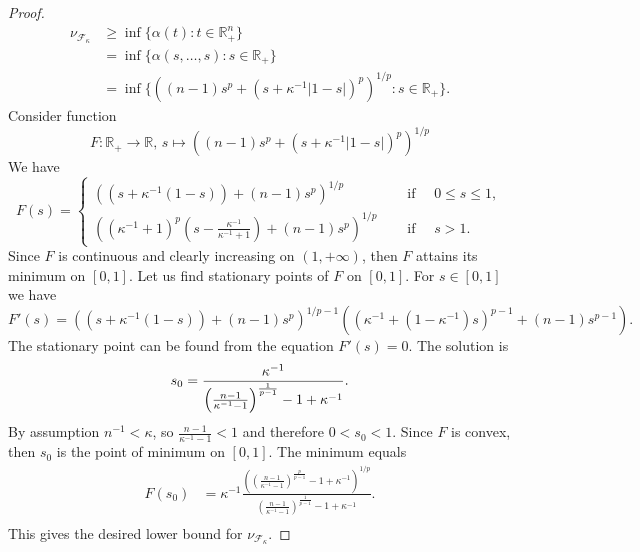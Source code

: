 \documentclass[12pt]{article}
\begin{document}
\begin{proof}
\[\begin{aligned}
        \nu_{\mathcal{F}_{\kappa}}
        &\geq\inf\{\alpha(t) : t\in\mathbb{R}_+^n\} \\
        &=\inf\{\alpha(s,\ldots,s) : s\in\mathbb{R}_+\} \\
        &=\inf\{((n-1)s^p+(s+\kappa^{-1}|1-s|)^p)^{1/p} : s\in\mathbb{R}_+\}.
    \end{aligned}
    \]
    Consider function
    \[
        F:\mathbb{R}_+\to\mathbb{R},\,
        s\mapsto ((n-1)s^p+(s+\kappa^{-1}|1-s|)^p)^{1/p}
    \]
    We have 
    \[
        F(s)=
        \begin{cases}
            ((s+\kappa^{-1}(1-s))+(n-1)s^p)^{1/p}
            \quad&\mbox{ if }\quad 0\leq s\leq 1, \\
            \left(
                (\kappa^{-1}+1)^p
                \left(s-\frac{\kappa^{-1}}{\kappa^{-1}+1}\right)+
                (n-1)s^p
            \right)^{1/p}
            \quad&\mbox{ if }\quad s>1.
        \end{cases}
    \]
    Since $F$ is continuous and clearly increasing on $(1,+\infty)$, 
    then $F$ attains its minimum on $[0, 1]$. Let us find stationary points 
    of $F$ on $[0, 1]$. For $s\in[0,1]$ we have
    \[
        F'(s)=
        ((s+\kappa^{-1}(1-s))+(n-1)s^p)^{1/p-1}
        ((\kappa^{-1}+(1-\kappa^{-1})s)^{p-1}+(n-1)s^{p-1}).
    \]
    The stationary point can be found from the equation $F'(s)=0$. 
    The solution is
    \[
        s_0
        =\frac{
            \kappa^{-1}
        }{
            \left(
                \frac{n-1}{\kappa^{-1}-1}
            \right)^{\frac{1}{p-1}}
            -1+\kappa^{-1}
        }.\\
    \]
    By assumption $n^{-1}<\kappa$, so $\frac{n-1}{\kappa^{-1}-1}<1$ and 
    therefore $0<s_0<1$. Since $F$ is convex, then $s_0$ is the point of 
    minimum on $[0,1]$. The minimum equals
    \[
    \begin{aligned}
        F(s_0)
        &=\kappa^{-1}
            \frac{
                \left(
                    \left(\frac{n-1}{\kappa^{-1}-1}
                    \right)^{\frac{p}{p-1}}
                    -1+\kappa^{-1}
                \right)^{1/p}
            }{
                \left(\frac{n-1}{\kappa^{-1}-1}
                \right)^{\frac{1}{p-1}}
                -1+\kappa^{-1}
            }. \\
    \end{aligned}
    \]
    This gives the desired lower bound for $\nu_{\mathcal{F}_{\kappa}}$.
\end{proof}
\end{document}
